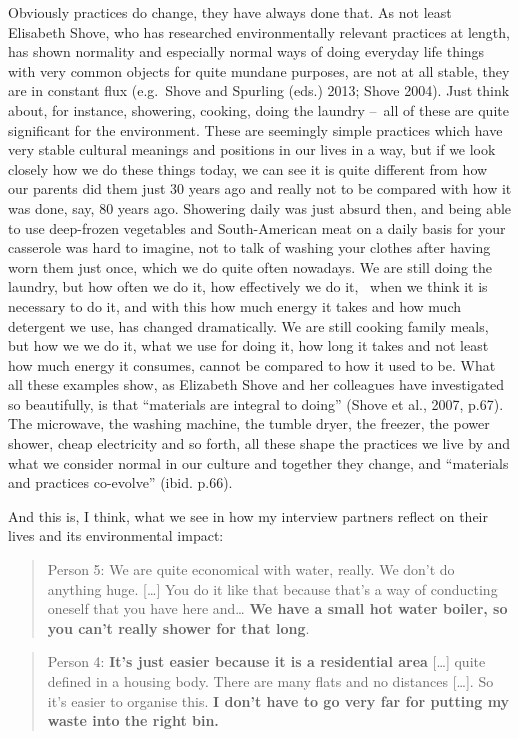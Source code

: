 \documentclass[a4paper,
fontsize=11pt,
oneside,
numbers=noperiodatend,
parskip=half-,
bibliography=totoc,
final
]{scrartcl}
\begin{document}
Obviously practices do change, they have always done that. As not least
Elisabeth Shove, who has researched environmentally relevant practices
at length, has shown normality and especially normal ways of doing
everyday life things with very common objects for quite mundane
purposes, are not at all stable, they are in constant flux (e.g.~Shove
and Spurling (eds.) 2013; Shove 2004). Just think about, for instance,
showering, cooking, doing the laundry --~all of these are quite
significant for the environment. These are seemingly simple practices
which have very stable cultural meanings and positions in our lives in a
way, but if we look closely how we do these things today, we can see it
is quite different from how our parents did them just 30 years ago and
really not to be compared with how it was done, say, 80 years ago.
Showering daily was just absurd then, and being able to use deep-frozen
vegetables and South-American meat on a daily basis for your casserole
was hard to imagine, not to talk of washing your clothes after having
worn them just once, which we do quite often nowadays. We are still
doing the laundry, but how often we do it, how effectively we do it,~
when we think it is necessary to do it, and with this how much energy it
takes and how much detergent we use, has changed dramatically. We are
still cooking family meals, but how we we do it, what we use for doing
it, how long it takes and not least how much energy it consumes, cannot
be compared to how it used to be. What all these examples show, as
Elizabeth Shove and her colleagues have investigated so beautifully, is
that \enquote{materials are integral to doing} (Shove et al., 2007,
p.67). The microwave, the washing machine, the tumble dryer, the
freezer, the power shower, cheap electricity and so forth, all these
shape the practices we live by and what we consider normal in our
culture and together they change, and \enquote{materials and practices
co-evolve} (ibid. p.66).

And this is, I think, what we see in how my interview partners reflect
on their lives and its environmental impact:

\begin{quote}
Person 5: We are quite economical with water, really. We don't do
anything huge. {[}\ldots{}{]} You do it like that because that's a way
of conducting oneself that you have here and\ldots{} \textbf{We have a
small hot water boiler, so you can't really shower for that long}.~
\end{quote}

\begin{quote}
Person 4: \textbf{It's just easier because it is a residential area}
{[}\ldots{}{]} quite defined in a housing body. There are many flats and
no distances {[}\ldots{}{]}. So it's easier to organise this. \textbf{I
don't have to go very far for putting my waste into the right bin.}
\end{quote}
\end{document}
